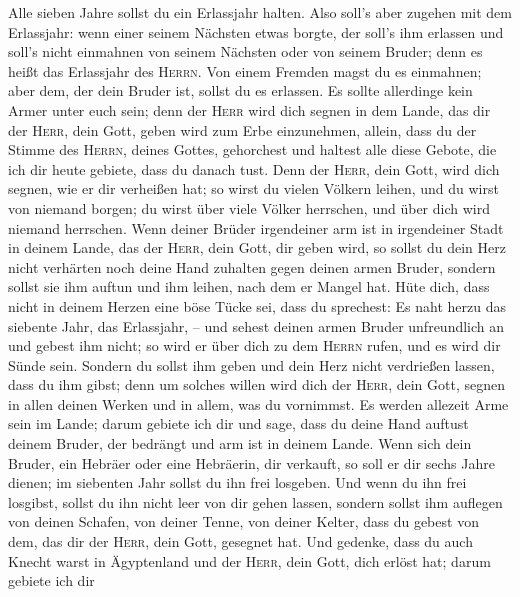  Alle sieben Jahre sollst du ein Erlassjahr halten.
 Also soll's aber zugehen mit dem Erlassjahr: wenn einer
seinem Nächsten etwas borgte, der soll's ihm erlassen und soll's nicht
einmahnen von seinem Nächsten oder von seinem Bruder; denn es heißt das
Erlassjahr des \textsc{Herrn}.  Von einem Fremden magst du
es einmahnen; aber dem, der dein Bruder ist, sollst du es erlassen.
 Es sollte allerdinge kein Armer unter euch sein; denn der
\textsc{Herr} wird dich segnen in dem Lande, das dir der \textsc{Herr},
dein Gott, geben wird zum Erbe einzunehmen,  allein, dass
du der Stimme des \textsc{Herrn}, deines Gottes, gehorchest und haltest
alle diese Gebote, die ich dir heute gebiete, dass du danach tust.
 Denn der \textsc{Herr}, dein Gott, wird dich segnen, wie
er dir verheißen hat; so wirst du vielen Völkern leihen, und du wirst
von niemand borgen; du wirst über viele Völker herrschen, und über dich
wird niemand herrschen.  Wenn deiner Brüder irgendeiner
arm ist in irgendeiner Stadt in deinem Lande, das der \textsc{Herr},
dein Gott, dir geben wird, so sollst du dein Herz nicht verhärten noch
deine Hand zuhalten gegen deinen armen Bruder,  sondern
sollst sie ihm auftun und ihm leihen, nach dem er Mangel hat.
 Hüte dich, dass nicht in deinem Herzen eine böse Tücke
sei, dass du sprechest: Es naht herzu das siebente Jahr, das Erlassjahr,
-- und sehest deinen armen Bruder unfreundlich an und gebest ihm nicht;
so wird er über dich zu dem \textsc{Herrn} rufen, und es wird dir Sünde
sein.  Sondern du sollst ihm geben und dein Herz nicht
verdrießen lassen, dass du ihm gibst; denn um solches willen wird dich
der \textsc{Herr}, dein Gott, segnen in allen deinen Werken und in
allem, was du vornimmst.  Es werden allezeit Arme sein im
Lande; darum gebiete ich dir und sage, dass du deine Hand auftust deinem
Bruder, der bedrängt und arm ist in deinem Lande.  Wenn
sich dein Bruder, ein Hebräer oder eine Hebräerin, dir verkauft, so soll
er dir sechs Jahre dienen; im siebenten Jahr sollst du ihn frei
losgeben.  Und wenn du ihn frei losgibst, sollst du ihn
nicht leer von dir gehen lassen,  sondern sollst ihm
auflegen von deinen Schafen, von deiner Tenne, von deiner Kelter, dass
du gebest von dem, das dir der \textsc{Herr}, dein Gott, gesegnet hat.
 Und gedenke, dass du auch Knecht warst in Ägyptenland
und der \textsc{Herr}, dein Gott, dich erlöst hat; darum gebiete ich dir
